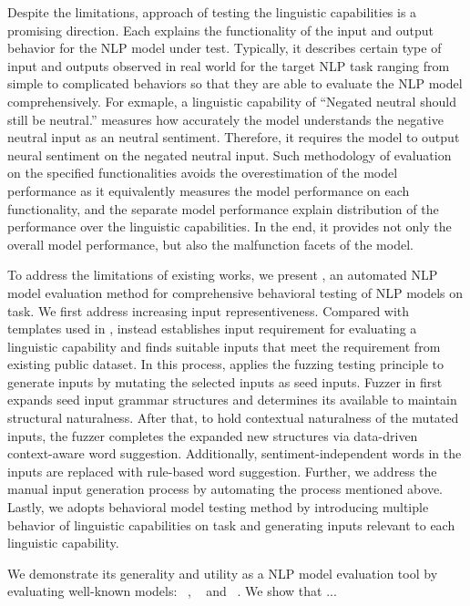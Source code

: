Despite the limitations, \Cklst approach of testing the linguistic
capabilities is a promising direction. Each \lc explains the
functionality of the input and output behavior for the NLP model under
test. Typically, it describes certain type of input and outputs
observed in real world for the target NLP task ranging from simple to
complicated behaviors so that they are able to evaluate the NLP model
comprehensively. For exmaple, a linguistic capability of ``Negated
neutral should still be neutral.'' measures how accurately the \sa
model understands the negative neutral input as an neutral
sentiment. Therefore, it requires the \sa model to output neural
sentiment on the negated neutral input.  Such methodology of
evaluation on the specified functionalities avoids the overestimation
of the model performance as it equivalently measures the model
performance on each functionality, and the separate model performance
explain distribution of the performance over the linguistic
capabilities. In the end, it provides not only the overall model
performance, but also the malfunction facets of the model.

To address the limitations of existing works, we present \tool, an
automated NLP model evaluation method for comprehensive behavioral
testing of NLP models on \sa task. We first address increasing input
representiveness. Compared with templates used in \Cklst, \tool
instead establishes input requirement for evaluating a linguistic
capability and finds suitable inputs that meet the requirement from
existing public dataset. In this process, \tool applies the fuzzing
testing principle to generate inputs by mutating the selected inputs
as seed inputs. Fuzzer in \tool first expands seed input grammar
structures and determines its available \pos to maintain structural
naturalness. After that, to hold contextual naturalness of the mutated
inputs, the fuzzer completes the expanded new structures via
data-driven context-aware word suggestion. Additionally,
sentiment-independent words in the inputs are replaced with rule-based
word suggestion. Further, we address the manual input generation
process by automating the process mentioned above. Lastly, we adopts
behavioral model testing method by introducing multiple behavior of
linguistic capabilities on \sa task and generating inputs relevant to
each linguistic capability.

We demonstrate its generality and utility as a NLP model evaluation
tool by evaluating well-known \sa models: \Bert~\cite{devlin2019bert},
\Roberta~\cite{liu2019roberta} and \Dbert~\cite{sanh2019distilbert}.
We show that ...
